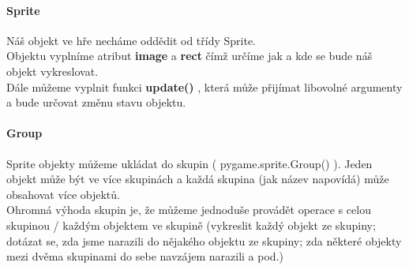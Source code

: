 \paragraph{Sprite}
Náš objekt ve hře necháme oddědit od třídy Sprite.\\Objektu vyplníme atribut \textbf{image} a \textbf{rect} čímž určíme jak a kde se bude náš objekt vykreslovat.\\Dále můžeme vyplnit funkci \textbf{update()} , která může přijímat libovolné argumenty a bude určovat změnu stavu objektu.

\paragraph{Group}
Sprite objekty můžeme ukládat do skupin ( pygame.sprite.Group() ). Jeden objekt může být ve více skupinách a každá skupina (jak název napovídá) může obsahovat více objektů.\\Ohromná výhoda skupin je, že můžeme jednoduše provádět operace s celou skupinou / každým objektem ve skupině (vykreslit každý objekt ze skupiny; dotázat se, zda jsme narazili do nějakého objektu ze skupiny; zda některé objekty mezi dvěma skupinami do sebe navzájem narazili a pod.)


